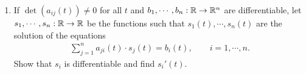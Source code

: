 \begin{problems}
{\begin{enumerate}[label={\upshape(\alph*)}]
\begin{align*}
{\begin{matrix}
                        \vdots & & \vdots \\
                        a_{n1}(t) & \cdots & a_{nn}(t)
                    \end{matrix}\right).}
                \end{align*}
            \item If $\det (a_{ij}(t)) \neq 0$ for all $t$ and $b_1, \cdots, b_n:\mathbb{R}\to \mathbb{R}^n$ are 
                differentiable, let $s_1, \cdots, s_n:\mathbb{R}\to \mathbb{R}$ be the functions such that $s_1(t), \cdots, s_n(t)$
                are the solution of the equations 
                \begin{align*}
                    \sum_{j=1}^{n}{a_{ji}(t)\cdot s_j(t)} = b_i(t),\qquad i=1, \cdots, n.
                \end{align*}
                Show that $s_i$ is differentiable and find $s_i'(t)$.
        \end{enumerate}
        }
\end{problems}